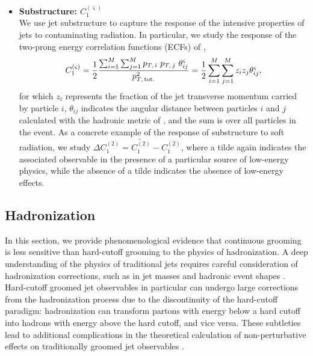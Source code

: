 \documentclass[letterpaper,11pt]{article}
\begin{document}
\begin{itemize}
    \item \textbf{Substructure: \(C_1^{(\varsigma)}\)}
    \\
    We use jet substructure to capture the response of the intensive properties of jets to contaminating radiation.
    In particular, we study the response of the two-prong energy correlation functions (ECFs) of ,
    \begin{equation}
        C_1^{(\varsigma)}
        =
        \frac{1}{2}\frac{\sum_{i=1}^M\sum_{j=1}^M p_{T,\,i}\ p_{T,\,j}\ \theta_{ij}^\varsigma}{p_{T,\,{\rm tot.}}^2}
        =
        \frac{1}{2}\sum_{i=1}^M\sum_{j=1}^M z_i z_j \theta_{ij}^\varsigma
        \label{eqn:ECFdefn}
        ,
    \end{equation}
    for which \(z_i\) represents the fraction of the jet transverse momentum carried by particle \(i\), \(\theta_{ij}\) indicates the angular distance between particles \(i\) and \(j\) calculated with the hadronic metric of , and the sum is over all particles in the event.
    As a concrete example of the response of substructure to soft radiation, we study \(\Delta C_1^{(2)} = \widetilde{C_1^{(2)}} - C_1^{(2)}\), where a tilde again indicates the associated observable in the presence of a particular source of low-energy physics, while the absence of a tilde indicates the absence of low-energy effects.
\end{itemize}


\subsection{Hadronization}
\label{sec:hadronization}

In this section, we provide phenomenological evidence that continuous grooming is less sensitive than hard-cutoff grooming to the physics of hadronization.
%
A deep understanding of the physics of traditional jets requires careful consideration of hadronization corrections, such as in jet masses \cite{Hoang:2019ceu, Marzani:2017kqd, Benkendorfer:2021unv} and hadronic event shapes \cite{Dokshitzer:1995zt, Baron:2020xoi}.
%
Hard-cutoff groomed jet observables in particular can undergo large corrections from the hadronization process due to the discontinuity of the hard-cutoff paradigm:
%
hadronization can transform partons with energy below a hard cutoff into hadrons with energy above the hard cutoff, and vice versa.
%
These subtleties lead to additional complications in the theoretical calculation of non-perturbative effects on traditionally groomed jet observables \cite{Hoang:2019ceu}.
\end{document}
